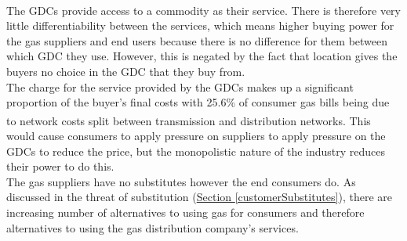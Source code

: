 \documentclass[11pt]{article}		%
\newcommand{\supercite}[1]{\textsuperscript{\cite{#1}}}		%
\newcommand{\sectref}[1]{\hyperref[#1]{Section \ref*{#1}}}     %
\begin{document}
                \\
                \hspace*{2ex}
                The GDCs provide access to a commodity as their service. There is therefore very little differentiability between the services, which means higher buying power for the gas suppliers and end users because there is no difference for them between which GDC they use. However, this is negated by the fact that location gives the buyers no choice in the GDC that they buy from.
              \\
                \hspace*{2ex}
                The charge for the service provided by the GDCs makes up a significant proportion of the buyer’s final costs with 25.6\% of consumer gas bills being due to network costs split between transmission and distribution networks\supercite{gas_cost}. %
                This would cause consumers to apply pressure on suppliers to apply pressure on the GDCs to reduce the price, but the monopolistic nature of the industry reduces their power to do this.
                \\
                \hspace*{2ex}
                The gas suppliers have no substitutes however the end consumers do. As discussed in the threat of substitution (\sectref{customerSubstitutes}), there are increasing number of alternatives to using gas for consumers and therefore alternatives to using the gas distribution company’s services. %
\end{document}
